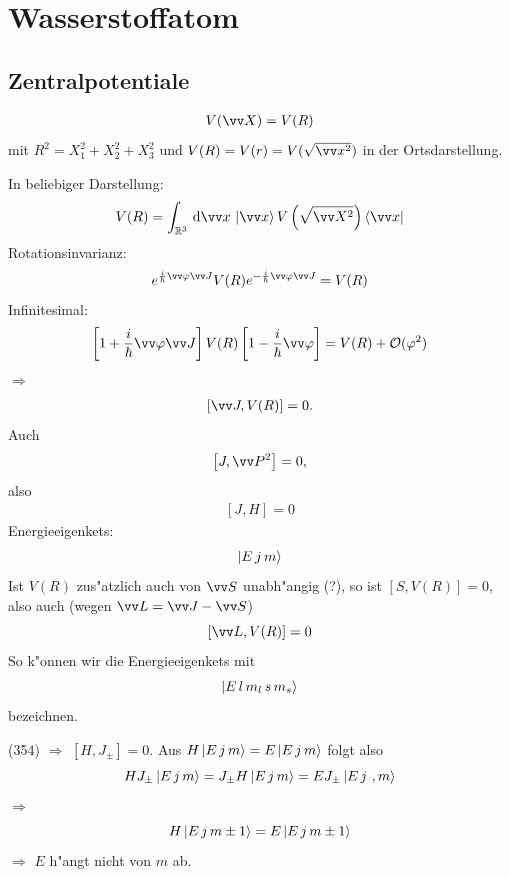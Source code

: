 \documentclass[a4paper]{scrartcl}
\newcommand{\RR}{\ensuremath \mathbb{R}}
\newcommand{\dd}{\ensuremath \, \mathrm{d}}
\renewcommand{\phi}{\ensuremath \varphi}
\newcommand{\eqn}[1]{\begin{align} #1 \end{align}}
\begin{document}
{\section{Wasserstoffatom}

\subsection{Zentralpotentiale}

\eqn{V(\vv X) = V(R)}
mit $R^2 = X_1^2 + X_2^2 + X_3^2$ und $V(R) = V(r) = V(\sqrt{\vv x^2})$ in der Ortsdarstellung.

In beliebiger Darstellung:
$$V(R) = \int_{\RR^3} \dd \vv x \, \Ket{\vv x} V\left(\sqrt{ \vv X^2}\right) \Bra{\vv x}$$
Rotationsinvarianz:
$$e^{\frac i \hbar \vv \phi \vv J} V(R) e^{- \frac i \hbar \vv \phi \vv J} = V(R)$$
Infinitesimal:
$$\left[ 1 + \frac i \hbar \vv \phi \vv J \right] V(R) \left[1 - \frac i \hbar \vv \phi \right] = V(R) + \mathcal O(\phi^2)$$
$\Longrightarrow$
\eqn{ \left[ \vv J , V(R) \right] = 0.}
Auch
\eqn{ \left[ J, \vv P^2 \right] = 0, }
also 
\eqn{ \left[ J, H \right] = 0 }
Energieeigenkets:
\eqn{\Ket{ E \, j \, m}}
Ist $V(R)$ zus"atzlich auch von $\vv S$ unabh"angig (?), so ist $[S, V(R)] = 0$, also auch (wegen $\vv L = \vv J - \vv S$)
$$\left[ \vv L, V(R) \right] = 0$$
So k"onnen wir die Energieeigenkets mit
\eqn{ \Ket{E \, l \, m_l \, s \, m_s } }
bezeichnen.

(354) $\Longrightarrow$ $[H, J_\pm] = 0$. Aus $H \Ket{ E \, j \, m} = E \Ket{ E \, j \, m }$ folgt also
$$H J_\pm \Ket{E \, j \, m} = J_\pm H \Ket{E \, j \, m} = E J_\pm \Ket{ E \, j \ , m }$$
$\Longrightarrow$
$$H \Ket{E \, j \, m \pm 1} = E \Ket{ E \, j \, m\pm 1}$$
$\Longrightarrow$ $E$ h"angt nicht von $m$ ab.

}
\end{document}

